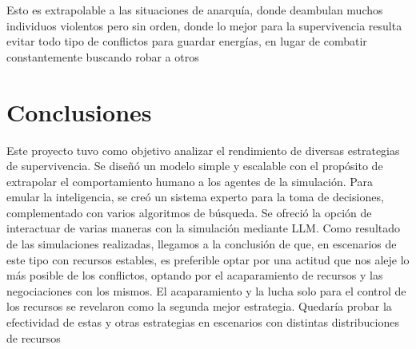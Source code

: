 \documentclass[11pt]{article}
\begin{document}
Esto es extrapolable a las situaciones de anarquía, donde deambulan muchos individuos violentos pero sin orden, donde lo mejor para la supervivencia resulta evitar todo tipo de conflictos para guardar energías, en lugar de combatir constantemente buscando robar a otros

\section{Conclusiones}
Este proyecto tuvo como objetivo analizar el rendimiento de diversas estrategias de supervivencia. Se diseñó un modelo simple y escalable con el propósito de extrapolar el comportamiento humano a los agentes de la simulación. Para emular la inteligencia, se creó un sistema experto para la toma de decisiones, complementado con varios algoritmos de búsqueda.
Se ofreció la opción de interactuar de varias maneras con la simulación mediante LLM. Como resultado de las simulaciones realizadas, llegamos a la conclusión de que, en escenarios de este tipo con recursos estables, es preferible optar por una actitud que nos aleje lo más posible de los conflictos, optando por el acaparamiento de recursos y las negociaciones con los mismos.
El acaparamiento y la lucha solo para el control de los recursos se revelaron como la segunda mejor estrategia. Quedaría probar la efectividad de estas y otras estrategias en escenarios con distintas distribuciones de recursos
\end{document}

